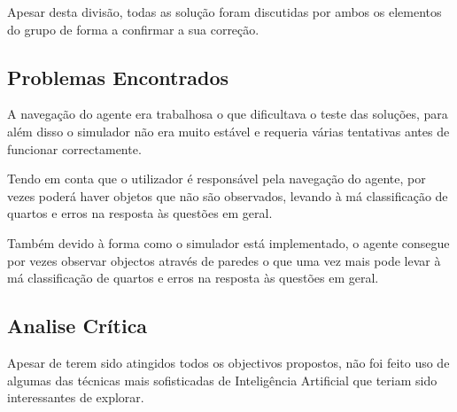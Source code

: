 Apesar desta divisão, todas as solução foram discutidas por ambos os elementos do grupo de forma a confirmar a sua correção.

\subsection{Problemas Encontrados}
\label{chap4:sec:problemas}

A navegação do agente era trabalhosa o que dificultava o teste das soluções, para além disso o simulador não era muito estável e requeria várias tentativas antes de funcionar correctamente.

Tendo em conta que o utilizador é responsável pela navegação do agente, por vezes poderá haver objetos que não são observados, levando à má classificação de quartos e erros na resposta às questões em geral.

Também devido à forma como o simulador está implementado, o agente consegue por vezes observar objectos através de paredes o que uma vez mais pode levar à má classificação de quartos e erros na resposta às questões em geral.

\subsection{Analise Crítica}
\label{chap4:sec:critica}

Apesar de terem sido atingidos todos os objectivos propostos, não foi feito uso de algumas das técnicas mais sofisticadas de Inteligência Artificial que teriam sido interessantes de explorar.
